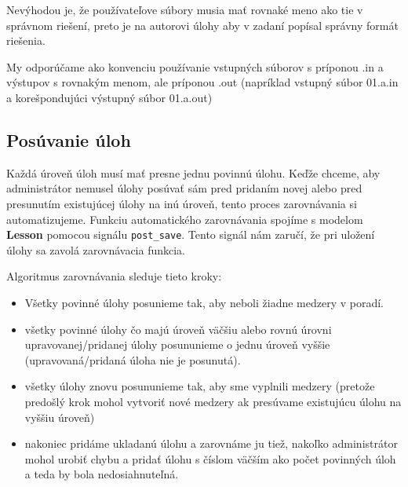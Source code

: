 Nevýhodou je, že používateľove súbory musia mať rovnaké meno ako tie v správnom riešení,
preto je na autorovi úlohy aby v zadaní popísal správny formát riešenia.

My odporúčame ako konvenciu používanie vstupných súborov s príponou .in a výstupov
s rovnakým menom, ale príponou .out (napríklad vstupný súbor 01.a.in a korešpondujúci výstupný súbor 01.a.out)

\subsection{Posúvanie úloh}
\label{implementacia:posuvanie}
Každá úroveň úloh musí mať presne jednu povinnú úlohu. Keďže chceme, aby administrátor
nemusel úlohy posúvať sám pred pridaním novej alebo pred presunutím existujúcej úlohy na inú úroveň,
tento proces zarovnávania si automatizujeme. Funkciu automatického zarovnávania
spojíme s modelom \textbf{Lesson} pomocou signálu \lstinline[language=Python]{post_save}.
Tento signál nám zaručí, že pri uložení úlohy sa zavolá zarovnávacia funkcia.

Algoritmus zarovnávania sleduje tieto kroky:
\begin{itemize}
\item Všetky povinné úlohy posunieme tak, aby neboli žiadne medzery v poradí.
\item všetky povinné úlohy čo majú úroveň väčšiu alebo rovnú úrovni upravovanej/pridanej
 úlohy posununieme o jednu úroveň vyššie (upravovaná/pridaná úloha nie je posunutá).
\item všetky úlohy znovu posununieme tak, aby sme vyplnili medzery (pretože predošlý krok mohol
    vytvoriť nové medzery ak presúvame existujúcu úlohu na vyššiu úroveň)
\item nakoniec pridáme ukladanú úlohu a zarovnáme ju tiež, nakoľko administrátor mohol urobiť chybu a pridať úlohu
    s číslom väčším ako počet povinných úloh a teda by bola nedosiahnuteľná.
\end{itemize}

